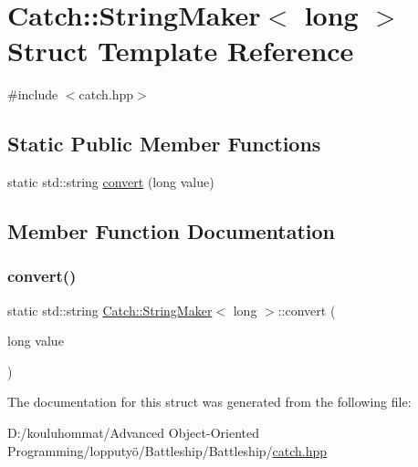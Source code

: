\hypertarget{struct_catch_1_1_string_maker_3_01long_01_4}{}\section{Catch\+:\+:String\+Maker$<$ long $>$ Struct Template Reference}
\label{struct_catch_1_1_string_maker_3_01long_01_4}


{\ttfamily \#include $<$catch.\+hpp$>$}

\subsection*{Static Public Member Functions}
\begin{DoxyCompactItemize}
\item 
static std\+::string \mbox{\hyperlink{struct_catch_1_1_string_maker_3_01long_01_4_a1c0c56497813e7a6425c5411d5e66447}{convert}} (long value)
\end{DoxyCompactItemize}


\subsection{Member Function Documentation}
\mbox{\label{struct_catch_1_1_string_maker_3_01long_01_4_a1c0c56497813e7a6425c5411d5e66447}} 
\subsubsection{\texorpdfstring{convert()}{convert()}}
{\footnotesize\ttfamily static std\+::string \mbox{\hyperlink{struct_catch_1_1_string_maker}{Catch\+::\+String\+Maker}}$<$ long $>$\+::convert (\begin{DoxyParamCaption}\item[{long}]{value }\end{DoxyParamCaption})\hspace{0.3cm}{\ttfamily [static]}}



The documentation for this struct was generated from the following file\+:\begin{DoxyCompactItemize}
\item 
D\+:/kouluhommat/\+Advanced Object-\/\+Oriented Programming/lopputyö/\+Battleship/\+Battleship/\mbox{\hyperlink{catch_8hpp}{catch.\+hpp}}\end{DoxyCompactItemize}
